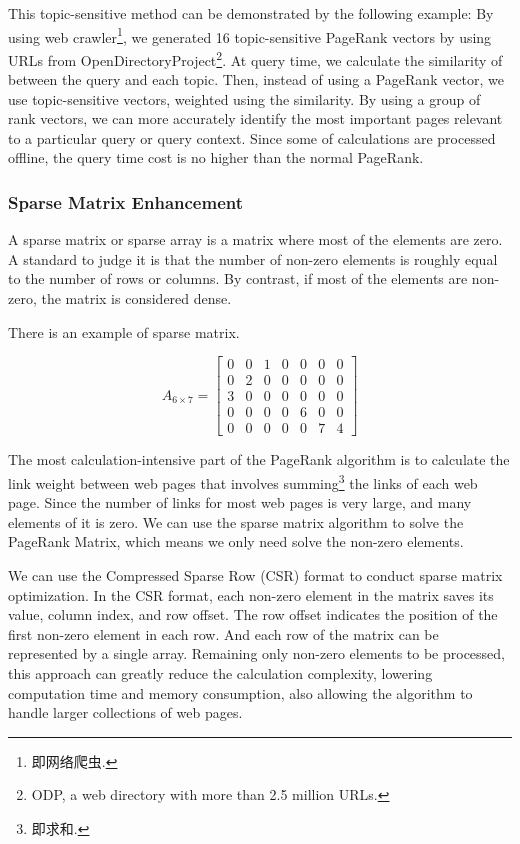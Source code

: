 \documentclass[lettersize,journal,12pt,conference]{IEEEtran}
\begin{document}
This topic-sensitive method can be demonstrated by the following example:\cite{ref7}
By using web crawler\footnote[3]{即网络爬虫.}, we generated 16 topic-sensitive PageRank vectors by using URLs from OpenDirectoryProject\footnote[4]{ODP, a web directory with more than 2.5 million URLs.}. 
At query time, we calculate the similarity of between the query and each topic. 
Then, instead of using a PageRank vector, we use topic-sensitive vectors, weighted using the similarity. 
By using a group of rank vectors, we can more accurately identify the most important pages relevant to a particular query or query context. 
Since some of calculations are processed offline, the query time cost is no higher than the normal PageRank.

\subsubsection{Sparse Matrix Enhancement}

A sparse matrix or sparse array is a matrix where most of the elements are zero. 
A standard to judge it is that the number of non-zero elements is roughly equal to the number of rows or columns. By contrast, if most of the elements are non-zero, the matrix is considered dense.

There is an example of sparse matrix.

\begin{equation}
	A_{6\times 7}=
	\begin{bmatrix}
		0&0&1&0&0&0&0\\
		0&2&0&0&0&0&0\\
		3&0&0&0&0&0&0\\
		0&0&0&0&6&0&0\\
		0&0&0&0&0&7&4
	\end{bmatrix}
\end{equation}

The most calculation-intensive part of the PageRank algorithm is to calculate the link weight between web pages that involves summing\footnote[1]{即求和.} the links of each web page. 
Since the number of links for most web pages is very large, and many elements of it is zero. We can use the sparse matrix algorithm to solve the PageRank Matrix, which means we only need solve the non-zero elements.

We can use the Compressed Sparse Row (CSR) format to conduct sparse matrix optimization. 
In the CSR format, each non-zero element in the matrix saves its value, column index, and row offset. 
The row offset indicates the position of the first non-zero element in each row. 
And each row of the matrix can be represented by a single array. 
Remaining only non-zero elements to be processed, this approach can greatly reduce the calculation complexity, lowering computation time and memory consumption, also allowing the algorithm to handle larger collections of web pages.
\end{document}
